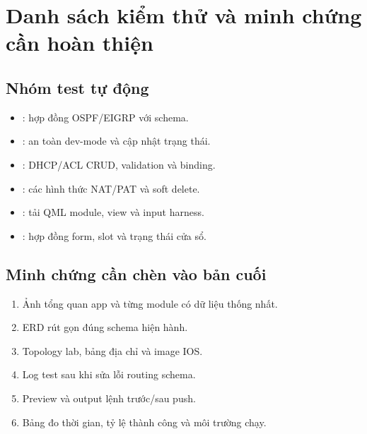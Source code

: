 \chapter{Danh sách kiểm thử và minh chứng cần hoàn thiện}
\label{app:tests}

\section{Nhóm test tự động}

\begin{itemize}
  \item {}: hợp đồng OSPF/EIGRP với schema.
  \item {}: an toàn dev-mode và cập nhật trạng thái.
  \item {}: DHCP/ACL CRUD, validation và binding.
  \item {}: các hình thức NAT/PAT và soft delete.
  \item {}: tải QML module, view và input harness.
  \item {}: hợp đồng form, slot và trạng thái cửa sổ.
\end{itemize}

\section{Minh chứng cần chèn vào bản cuối}

\begin{enumerate}
  \item Ảnh tổng quan app và từng module có dữ liệu thống nhất.
  \item ERD rút gọn đúng schema hiện hành.
  \item Topology lab, bảng địa chỉ và image IOS.
  \item Log test sau khi sửa lỗi routing schema.
  \item Preview và output lệnh  trước/sau push.
  \item Bảng đo thời gian, tỷ lệ thành công và môi trường chạy.
\end{enumerate}
